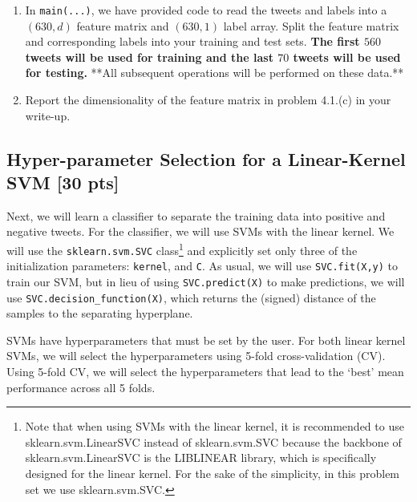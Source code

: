 \documentclass[11pt]{article}
\begin{document}
\begin{enumerate}
\item {} In \verb|main(...)|, we have provided code to read the tweets and labels into a $(630,d)$ feature matrix and $(630,1)$ label array. Split the feature matrix and corresponding labels into your training and test sets. \textbf{The first $560$ tweets will be used for training and the last $70$ tweets will be used for testing.} **All subsequent operations will be performed on these data.**
\item {} Report the dimensionality of the feature matrix in problem 4.1.(c) in your write-up. 
\solution{
}
\end{enumerate}





\subsection{Hyper-parameter Selection for a Linear-Kernel SVM [30 pts]}\label{sec:linear}

Next, we will learn a classifier to separate the training data into positive and negative tweets. For the classifier, we will use SVMs with the linear kernel. We will use the \verb|sklearn.svm.SVC| class\footnote{Note that when using SVMs with the linear kernel, it is recommended to use sklearn.svm.LinearSVC instead of sklearn.svm.SVC because the backbone of sklearn.svm.LinearSVC is the LIBLINEAR library, which is specifically designed for the linear kernel. For the sake of the simplicity, in this problem set we use sklearn.svm.SVC. } and explicitly set only three of the initialization parameters: \verb|kernel|, and \verb|C|. As usual, we will use \verb|SVC.fit(X,y)| to train our SVM, but in lieu of using \verb|SVC.predict(X)| to make predictions, we will use \verb|SVC.decision_function(X)|, which returns the (signed) distance of the samples to the separating hyperplane.

SVMs have hyperparameters that must be set by the user. For both linear kernel SVMs, we will select the hyperparameters using 5-fold cross-validation (CV). Using 5-fold CV, we will select the hyperparameters that lead to the `best' mean performance across all 5 folds.
\end{document}
